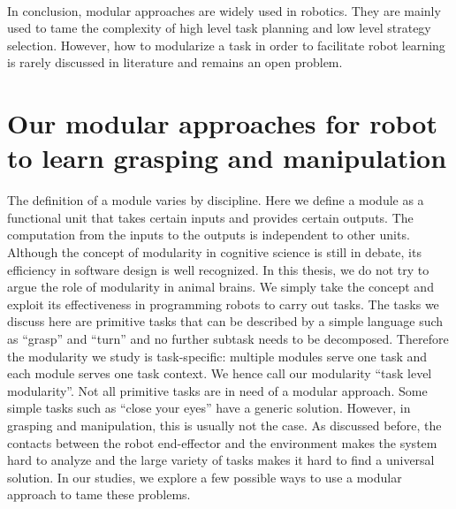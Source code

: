 ~\\
In conclusion, modular approaches are widely used in robotics. They are mainly used to tame the complexity of high level task planning and low level strategy selection. However, how to modularize a task in order to facilitate robot learning is rarely discussed in literature and remains an open problem.






\section{Our modular approaches for robot to learn grasping and manipulation}
\label{cha1:contribution}
The definition of a module varies by discipline. Here we define a module as a functional unit that takes certain inputs and provides certain outputs. The computation from the inputs to the outputs is independent to other units. Although the concept of modularity in cognitive science is still in debate, its efficiency in software design is well recognized. In this thesis, we do not try to argue the role of modularity in animal brains. We simply take the concept and exploit its effectiveness in programming robots to carry out tasks. The tasks we discuss here are primitive tasks that can be described by a simple language such as ``grasp'' and ``turn'' and no further subtask needs to be decomposed. Therefore the modularity we study is task-specific: multiple modules serve one task and each module serves one task context. We hence call our modularity ``task level modularity''. Not all primitive tasks are in need of a modular approach. Some simple tasks such as ``close your eyes'' have a generic solution. However, in grasping and manipulation, this is usually not the case. As discussed before, the contacts between the robot end-effector and the environment makes the system hard to analyze and the large variety of tasks makes it hard to find a universal solution. In our studies, we explore a few possible ways to use a modular approach to tame these problems.


